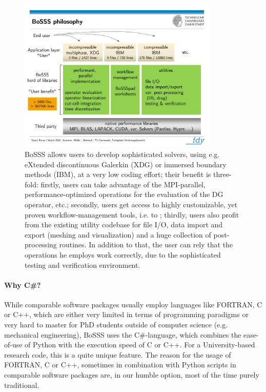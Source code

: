 \documentclass[a4paper,10pt]{report} %
\begin{document}
\begin{figure}[!h]
\begin{center}
\includegraphics[width=0.85\textwidth]{figures/BoSSS-philosophy-1}
\end{center}
\caption{
BoSSS allows users to develop sophisticated solvers,
using e.g. eXtended discontinuous Galerkin (XDG)
or immersed boundary methods (IBM),
at a very low coding effort;
their benefit is three-fold: firstly, users can take advantage of the MPI-parallel,
performance-optimized operations for the evaluation of the DG operator, etc.;
secondly, users get access to highly customizable, yet proven workflow-management tools,
i.e. to \BoSSSpad{}; thirdly, users also profit from the existing utility codebase
for file I/O, data import and export (meshing and visualization) and a huge collection
of post-processing routines.
In addition to that, the user can rely that the operations he employs work correctly, due to the
sophisticated testing and verification environment.
}
\label{fig:BoSSS-Philosophy-1}
\end{figure}


\paragraph{Why C\#?}
While comparable software packages usually employ languages like
FORTRAN, C or C++, which are either very limited in terms of programming paradigms
or very hard to master for PhD students outside of computer science
(e.g. mechanical engineering),
BoSSS uses the C\#-language, which combines the
ease-of-use of Python with the execution speed of C or C++.
For a University-based research code, this is a quite unique feature.
The reason for the usage of 
FORTRAN, C or C++, sometimes in combination with Python scripts
in comparable software packages are, 
in our humble option, most of the time purely traditional.
\end{document}
